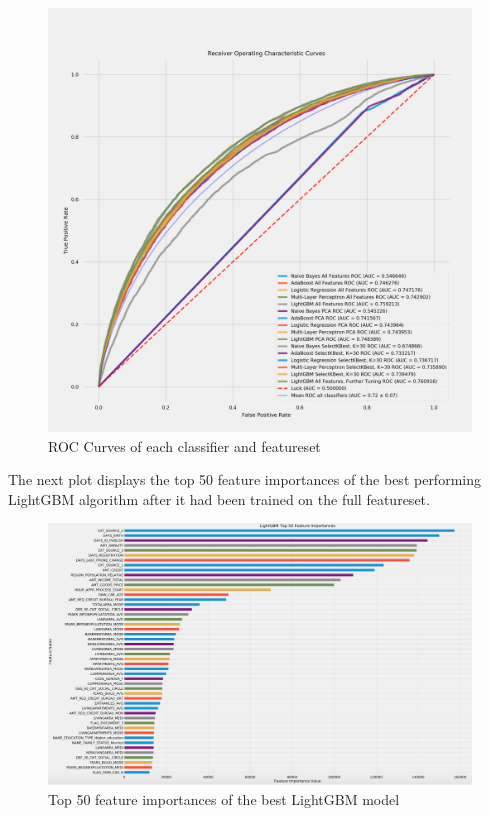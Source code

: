 \documentclass[12pt, letterpaper]{article}
\begin{document}
\begin{figure}[h!]
\includegraphics[width=\textwidth]{ReceiverOperatingCharacteristicCurves}
\centering
\caption{ROC Curves of each classifier and featureset}
\end{figure}

The next plot displays the top 50 feature importances of the best performing LightGBM algorithm after it had been trained on the full featureset.

\pagebreak

\begin{figure}[h!]
\includegraphics[width=\textwidth]{lightGBMFeatureImportances}
\centering
\caption{Top 50 feature importances of the best LightGBM model}
\end{figure}
\end{document}
